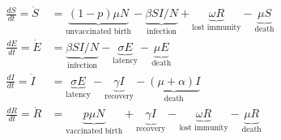 \begin{align*}

\frac{dS}{dt} = \dot{S}  &= \underbrace{(1-p)\mu N}_\textrm{unvaccinated birth} - \underbrace{\beta S I / N}_\textrm{infection} + \underbrace{\omega R}_\textrm{lost immunity} - \underbrace{ \mu S}_\text{death} 

\\

\frac{dE}{dt} = \dot{E} &=  \underbrace{\beta S I / N}_\textrm{infection} - \underbrace{\sigma E}_\textrm{latency} - \underbrace{\mu E}_\text{death}

\\

\frac{dI}{dt} = \dot{I} &=  \underbrace{\sigma E}_\textrm{latency} - \underbrace{\gamma I}_\text{recovery} - \underbrace{(\mu + \alpha)I}_\text{death}

\\

\frac{dR}{dt} = \dot{R} &= \underbrace{p \mu N}_\textrm{vaccinated birth} + \underbrace{\gamma I}_\textrm{recovery} - \underbrace{\omega R}_\textrm{lost immunity}  - \underbrace{\mu R}_\textrm{death}

\end{align*}
